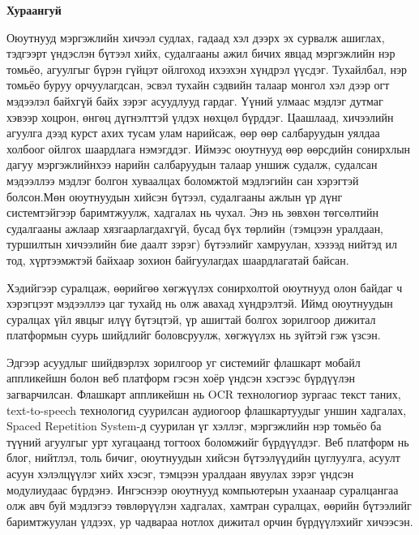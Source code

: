 
\vspace{10mm}

\begin{center}
\textbf{\large Хураангуй}
\end{center}

\sloppy

Оюутнууд мэргэжлийн хичээл судлах, гадаад хэл дээрх эх сурвалж ашиглах, тэдгээрт үндэслэн бүтээл хийх, судалгааны ажил бичих явцад мэргэжлийн нэр томьёо, агуулгыг бүрэн гүйцэт ойлгоход ихээхэн хүндрэл үүсдэг. Тухайлбал, нэр томьёо буруу орчуулагдсан, эсвэл тухайн сэдвийн талаар монгол хэл дээр огт мэдээлэл байхгүй байх зэрэг асуудлууд гардаг. Үүний улмаас мэдлэг дутмаг хэвээр хоцрон, өнгөц дүгнэлттэй үлдэх нөхцөл бүрддэг. Цаашлаад, хичээлийн агуулга дээд курст ахих тусам улам нарийсаж, өөр өөр салбаруудын уялдаа холбоог ойлгох шаардлага нэмэгддэг. Иймээс оюутнууд өөр өөрсдийн сонирхлын дагуу мэргэжлийнхээ нарийн салбаруудын талаар уншиж судалж, судалсан мэдээллээ мэдлэг болгон хуваалцах боломжтой мэдлэгийн сан хэрэгтэй болсон.Мөн оюутнуудын хийсэн бүтээл, судалгааны ажлын үр дүнг системтэйгээр баримтжуулж, хадгалах нь чухал. Энэ нь зөвхөн төгсөлтийн судалгааны ажлаар хязгаарлагдахгүй, бусад бүх төрлийн (тэмцээн уралдаан, туршилтын хичээлийн бие даалт зэрэг) бүтээлийг хамруулан, хэзээд нийтэд ил тод, хүртээмжтэй байхаар зохион байгуулагдах шаардлагатай байсан.

Хэдийгээр суралцаж, өөрийгөө хөгжүүлэх сонирхолтой оюутнууд олон байдаг ч хэрэгцээт мэдээллээ цаг тухайд нь олж авахад хүндрэлтэй. Иймд оюутнуудын суралцах үйл явцыг илүү бүтэцтэй, үр ашигтай болгох зорилгоор дижитал платформын суурь шийдлийг боловсруулж, хөгжүүлэх нь зүйтэй гэж үзсэн.

Эдгээр асуудлыг шийдвэрлэх зорилгоор уг системийг флашкарт мобайл аппликейшн болон веб платформ гэсэн хоёр үндсэн хэсгээс бүрдүүлэн загварчилсан. Флашкарт аппликейшн нь OCR технологиор зургаас текст таних, text-to-speech технологид суурилсан аудиогоор флашкартуудыг уншин хадгалах, Spaced Repetition System-д суурилан үг хэллэг, мэргэжлийн нэр томьёо ба түүний агуулгыг урт хугацаанд тогтоох боломжийг бүрдүүлдэг. Веб платформ нь блог, нийтлэл, толь бичиг, оюутнуудын хийсэн бүтээлүүдийн цуглуулга, асуулт асуун хэлэлцүүлэг хийх хэсэг, тэмцээн уралдаан явуулах зэрэг үндсэн модулиудаас бүрдэнэ. Ингэснээр оюутнууд компьютерын ухаанаар суралцангаа олж авч буй мэдлэгээ төвлөрүүлэн хадгалах, хамтран суралцах, өөрийн бүтээлийг баримтжуулан үлдээх, ур чадвараа нотлох дижитал орчин бүрдүүлэхийг хичээсэн.

